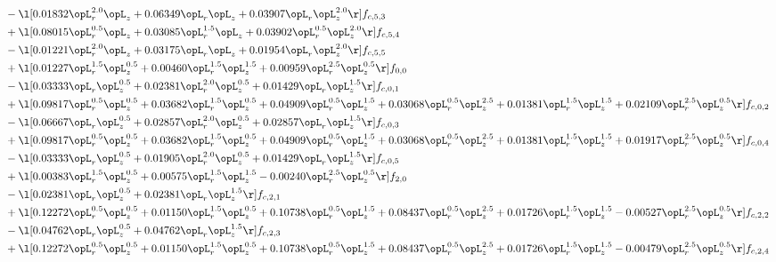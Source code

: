 \begin{alignat}{2}
& - \l[  0.01832 \opL_r^{2.0} \opL_z +  0.06349 \opL_r \opL_z +  0.03907 \opL_r \opL_z^{2.0}  \r] f_{c,5,3} \nonumber \\ 
& + \l[  0.08015 \opL_r^{0.5} \opL_z +  0.03085 \opL_r^{1.5} \opL_z +  0.03902 \opL_r^{0.5} \opL_z^{2.0}  \r] f_{c,5,4} \nonumber \\ 
& - \l[  0.01221 \opL_r^{2.0} \opL_z +  0.03175 \opL_r \opL_z +  0.01954 \opL_r \opL_z^{2.0}  \r] f_{c,5,5} \nonumber \\ 
& + \l[  0.01227 \opL_r^{1.5} \opL_z^{0.5} +  0.00460 \opL_r^{1.5} \opL_z^{1.5} +  0.00959 \opL_r^{2.5} \opL_z^{0.5}  \r] f_{0,0} \nonumber \\ 
& - \l[  0.03333 \opL_r \opL_z^{0.5} +  0.02381 \opL_r^{2.0} \opL_z^{0.5} +  0.01429 \opL_r \opL_z^{1.5}  \r] f_{c,0,1} \nonumber \\ 
& + \l[  0.09817 \opL_r^{0.5} \opL_z^{0.5} +  0.03682 \opL_r^{1.5} \opL_z^{0.5} +  0.04909 \opL_r^{0.5} \opL_z^{1.5} +  0.03068 \opL_r^{0.5} \opL_z^{2.5} +  0.01381 \opL_r^{1.5} \opL_z^{1.5} +  0.02109 \opL_r^{2.5} \opL_z^{0.5}  \r] f_{c,0,2} \nonumber \\ 
& - \l[  0.06667 \opL_r \opL_z^{0.5} +  0.02857 \opL_r^{2.0} \opL_z^{0.5} +  0.02857 \opL_r \opL_z^{1.5}  \r] f_{c,0,3} \nonumber \\ 
& + \l[  0.09817 \opL_r^{0.5} \opL_z^{0.5} +  0.03682 \opL_r^{1.5} \opL_z^{0.5} +  0.04909 \opL_r^{0.5} \opL_z^{1.5} +  0.03068 \opL_r^{0.5} \opL_z^{2.5} +  0.01381 \opL_r^{1.5} \opL_z^{1.5} +  0.01917 \opL_r^{2.5} \opL_z^{0.5}  \r] f_{c,0,4} \nonumber \\ 
& - \l[  0.03333 \opL_r \opL_z^{0.5} +  0.01905 \opL_r^{2.0} \opL_z^{0.5} +  0.01429 \opL_r \opL_z^{1.5}  \r] f_{c,0,5} \nonumber \\ 
& + \l[  0.00383 \opL_r^{1.5} \opL_z^{0.5} +  0.00575 \opL_r^{1.5} \opL_z^{1.5}   -0.00240 \opL_r^{2.5} \opL_z^{0.5}  \r] f_{2,0} \nonumber \\ 
& - \l[  0.02381 \opL_r \opL_z^{0.5} +  0.02381 \opL_r \opL_z^{1.5}  \r] f_{c,2,1} \nonumber \\ 
& + \l[  0.12272 \opL_r^{0.5} \opL_z^{0.5} +  0.01150 \opL_r^{1.5} \opL_z^{0.5} +  0.10738 \opL_r^{0.5} \opL_z^{1.5} +  0.08437 \opL_r^{0.5} \opL_z^{2.5} +  0.01726 \opL_r^{1.5} \opL_z^{1.5}   -0.00527 \opL_r^{2.5} \opL_z^{0.5}  \r] f_{c,2,2} \nonumber \\ 
& - \l[  0.04762 \opL_r \opL_z^{0.5} +  0.04762 \opL_r \opL_z^{1.5}  \r] f_{c,2,3} \nonumber \\ 
& + \l[  0.12272 \opL_r^{0.5} \opL_z^{0.5} +  0.01150 \opL_r^{1.5} \opL_z^{0.5} +  0.10738 \opL_r^{0.5} \opL_z^{1.5} +  0.08437 \opL_r^{0.5} \opL_z^{2.5} +  0.01726 \opL_r^{1.5} \opL_z^{1.5}   -0.00479 \opL_r^{2.5} \opL_z^{0.5}  \r] f_{c,2,4} \nonumber \\ 

\end{alignat}
